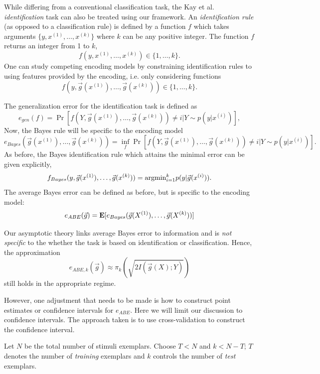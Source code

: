 \documentclass[12pt]{article}
\begin{document}
While differing from a conventional classification task, the Kay et
al. \emph{identification} task can also be treated using our
framework.  An \emph{identification rule} (as opposed to a
classification rule) is defined by a function $f$ which takes arguments
$\{y, x^{(1)},\hdots, x^{(k)}\}$ where $k$ can be any positive integer.
The function $f$ returns an integer from 1 to $k$,
\[
f(y, x^{(1)},\hdots, x^{(k)}) \in \{1,\hdots, k\}.
\]
One can study competing encoding models by constraining identification rules
to using features provided by the encoding, i.e. only considering functions
\[
f(y, \vec{g}(x^{(1)}),\hdots, \vec{g}(x^{(k)})) \in \{1,\hdots, k\}.
\]

The generalization error for the identification task is defined as
\[
e_{gen}(f) = \Pr[f(Y, \vec{g}(x^{(1)}),\hdots, \vec{g}(x^{(k)})) \neq i|Y \sim p(y|x^{(i)})],
\]
Now, the Bayes rule will be specific to the encoding model
\[
e_{Bayes}(\vec{g}(x^{(1)}),\hdots, \vec{g}(x^{(k)})) = \inf_f \Pr[f(Y, \vec{g}(x^{(1)}),\hdots, \vec{g}(x^{(k)})) \neq i|Y \sim p(y|x^{(i)})].
\]
As before, the Bayes identification rule which attains the minimal error can be given explicitly,
\[
f_{Bayes}(y, \vec{g}(x^{(1)}),\hdots, \vec{g}(x^{(k)})) = \text{argmin}_{i=1}^k p(y|\vec{g}(x^{(i)})).
\]
The average Bayes error can be defined as before, but is specific to the encoding model:
\[
e_{ABE}(\vec{g}) = \textbf{E}[e_{Bayes}(\vec{g}(X^{(1)}),\hdots, \vec{g}(X^{(k)}))]
\]

Our asymptotic theory links average Bayes error to information and
is \emph{not specific} to the whether the task is based on
identification or classification.  Hence, the approximation
\[
e_{ABE, k}(\vec{g}) \approx \pi_k(\sqrt{2 I(\vec{g}(X); Y)})
\]
still holds in the appropriate regime.


However, one adjustment that needs to be made is how to construct
point estimates or confidence intervals for $e_{ABE}$.
Here we will limit our discussion to confidence intervals.
The approach taken is to use cross-validation to construct the confidence interval.

Let $N$ be the total number of stimuli exemplars.  Choose $T < N$ and
$k < N - T$; $T$ denotes the number of \emph{training} exemplars and
$k$ controls the number of \emph{test} exemplars.
\end{document}
